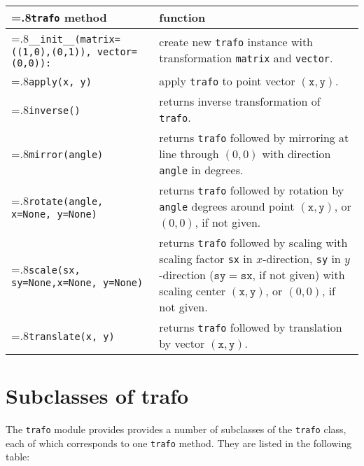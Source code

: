 \medskip
\begin{tabularx}{\linewidth}{>{\hsize=.8\hsize}X>{\raggedright\arraybackslash\hsize=1.2\hsize}X}
\texttt{trafo} method & function \\
\hline
\texttt{\_\_init\_\_(matrix=((1,0),(0,1)),\newline
\phantom{\_\_init\_\_(}vector=(0,0)):} & create new \texttt{trafo}
instance with transformation \texttt{matrix} and \texttt{vector}.
\\
\texttt{apply(x, y)} & apply \texttt{trafo} to point vector
$(\mathtt{x}, \mathtt{y})$.\\
\texttt{inverse()} & returns inverse transformation of
\texttt{trafo}.\\
\texttt{mirror(angle)} & returns \texttt{trafo} followed by mirroring
at line through $(0,0)$ with  direction \texttt{angle} in degrees.\\
\texttt{rotate(angle, \newline\phantom{rotate(}x=None, y=None)} &
returns \texttt{trafo} followed by rotation by \texttt{angle} degrees
around point $(\mathtt{x},
\mathtt{y})$, or $(0,0)$, if not given.\\
\texttt{scale(sx, sy=None,\newline\phantom{scale(}x=None, y=None)} &
returns \texttt{trafo} followed by
scaling with scaling factor \texttt{sx} in $x$-direction, \texttt{sy} in
$y$-direction ($\mathtt{sy}=\mathtt{sx}$, if not given) with scaling
center $(\mathtt{x}, \mathtt{y})$, or $(0,0)$, if not given.\\
\texttt{translate(x, y)} & returns \texttt{trafo} followed by
translation by vector $(\mathtt{x}, \mathtt{y})$.\\
\end{tabularx}
\medskip



\section{Subclasses of trafo}

The \verb|trafo| module provides provides a number of subclasses of
the \verb|trafo| class, each of which corresponds to one \verb|trafo|
method. They are listed in the following table:

